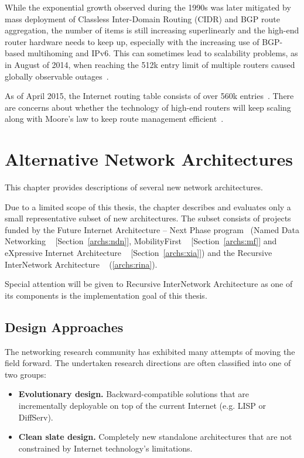         While the exponential growth observed during the 1990s was later mitigated by mass deployment of Classless Inter-Domain Routing (CIDR) and BGP route aggregation, the number of items is still increasing superlinearly and the high-end router hardware needs to keep up, especially with the increasing use of BGP-based multihoming and IPv6. This can sometimes lead to scalability problems, as in August of 2014, when reaching the 512k entry limit of multiple routers caused globally observable outages~\cite{512k_day}.

        As of April 2015, the Internet routing table consists of over 560k entries~\cite{bgpgrow}. There are concerns about whether the technology of high-end routers will keep scaling along with Moore's law to keep route management efficient~\cite{rfc4984}.


\chapter{Alternative Network Architectures}\label{archs}

    This chapter provides descriptions of several new network architectures.

    Due to a limited scope of this thesis, the chapter describes and evaluates only a small representative subset of new architectures. The subset consists of projects funded by the Future Internet Architecture -- Next Phase program~\cite{fia} (Named Data Networking ~\cite{ndn} [Section~\ref{archs:ndn}], MobilityFirst ~\cite{MobilityFirst} [Section~\ref{archs:mf}] and eXpressive Internet Architecture ~\cite{xia} [Section~\ref{archs:xia}]) and the Recursive InterNetwork Architecture ~\cite{Patterns} (\ref{archs:rina}).

    Special attention will be given to Recursive InterNetwork Architecture as one of its components is the implementation goal of this thesis.

    \section{Design Approaches}

        The networking research community has exhibited many attempts of moving the field forward. The undertaken research directions are often classified into one of two groups:

        \begin{itemize}
            \item \textbf{Evolutionary design.} Backward-compatible solutions that are incrementally deployable on top of the current Internet (e.g. LISP or DiffServ).
            \item \textbf{Clean slate design.} Completely new standalone architectures that are not constrained by Internet technology's limitations.
        \end{itemize}

